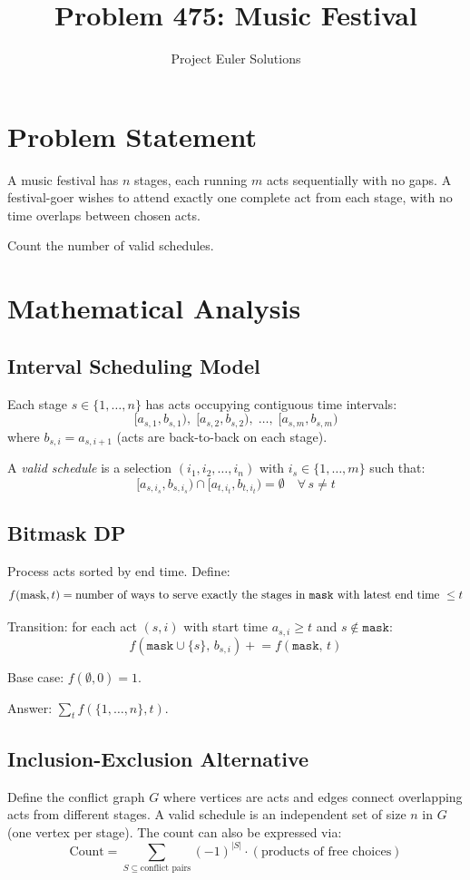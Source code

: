 \documentclass[11pt]{article}
\title{Problem 475: Music Festival}
\author{Project Euler Solutions}
\date{}
\begin{document}
\maketitle

\section{Problem Statement}
A music festival has $n$ stages, each running $m$ acts sequentially with no gaps. A festival-goer wishes to attend exactly one complete act from each stage, with no time overlaps between chosen acts.

Count the number of valid schedules.

\section{Mathematical Analysis}

\subsection{Interval Scheduling Model}
Each stage $s \in \{1, \ldots, n\}$ has acts occupying contiguous time intervals:
\[
[a_{s,1}, b_{s,1}), \; [a_{s,2}, b_{s,2}), \; \ldots, \; [a_{s,m}, b_{s,m})
\]
where $b_{s,i} = a_{s,i+1}$ (acts are back-to-back on each stage).

A \emph{valid schedule} is a selection $(i_1, i_2, \ldots, i_n)$ with $i_s \in \{1, \ldots, m\}$ such that:
\[
[a_{s,i_s}, b_{s,i_s}) \cap [a_{t,i_t}, b_{t,i_t}) = \emptyset \quad \forall\, s \ne t
\]

\subsection{Bitmask DP}
Process acts sorted by end time. Define:
\[
f(\text{mask}, t) = \text{number of ways to serve exactly the stages in \texttt{mask} with latest end time } \le t
\]

Transition: for each act $(s, i)$ with start time $a_{s,i} \ge t$ and $s \notin \texttt{mask}$:
\[
f(\texttt{mask} \cup \{s\}, \, b_{s,i}) \mathrel{+}= f(\texttt{mask}, \, t)
\]

Base case: $f(\emptyset, 0) = 1$.

Answer: $\sum_{t} f(\{1, \ldots, n\}, t)$.

\subsection{Inclusion-Exclusion Alternative}
Define the conflict graph $G$ where vertices are acts and edges connect overlapping acts from different stages. A valid schedule is an independent set of size $n$ in $G$ (one vertex per stage). The count can also be expressed via:
\[
\text{Count} = \sum_{S \subseteq \text{conflict pairs}} (-1)^{|S|} \cdot (\text{products of free choices})
\]
\end{document}
